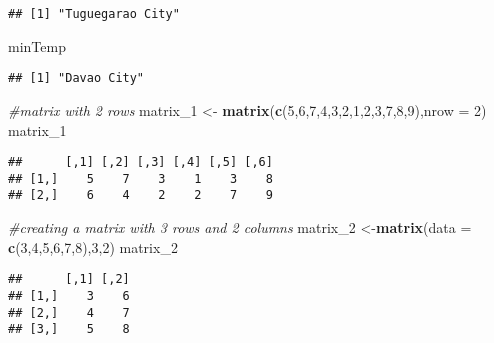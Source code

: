 \documentclass[
]{article}
\newenvironment{Shaded}{\begin{snugshade}}{\end{snugshade}}
\newcommand{\AttributeTok}[1]{\textcolor[rgb]{0.13,0.29,0.53}{#1}}
\newcommand{\CommentTok}[1]{\textcolor[rgb]{0.56,0.35,0.01}{\textit{#1}}}
\newcommand{\DecValTok}[1]{\textcolor[rgb]{0.00,0.00,0.81}{#1}}
\newcommand{\FunctionTok}[1]{\textcolor[rgb]{0.13,0.29,0.53}{\textbf{#1}}}
\newcommand{\NormalTok}[1]{#1}
\newcommand{\OtherTok}[1]{\textcolor[rgb]{0.56,0.35,0.01}{#1}}
\begin{document}
\begin{verbatim}
## [1] "Tuguegarao City"
\end{verbatim}

\begin{Shaded}
\begin{Highlighting}[]
\NormalTok{minTemp}
\end{Highlighting}
\end{Shaded}

\begin{verbatim}
## [1] "Davao City"
\end{verbatim}

\begin{Shaded}
\begin{Highlighting}[]
\CommentTok{\#matrix with 2 rows}
\NormalTok{matrix\_1 }\OtherTok{\textless{}{-}} \FunctionTok{matrix}\NormalTok{(}\FunctionTok{c}\NormalTok{(}\DecValTok{5}\NormalTok{,}\DecValTok{6}\NormalTok{,}\DecValTok{7}\NormalTok{,}\DecValTok{4}\NormalTok{,}\DecValTok{3}\NormalTok{,}\DecValTok{2}\NormalTok{,}\DecValTok{1}\NormalTok{,}\DecValTok{2}\NormalTok{,}\DecValTok{3}\NormalTok{,}\DecValTok{7}\NormalTok{,}\DecValTok{8}\NormalTok{,}\DecValTok{9}\NormalTok{),}\AttributeTok{nrow =} \DecValTok{2}\NormalTok{)}
\NormalTok{matrix\_1}
\end{Highlighting}
\end{Shaded}

\begin{verbatim}
##      [,1] [,2] [,3] [,4] [,5] [,6]
## [1,]    5    7    3    1    3    8
## [2,]    6    4    2    2    7    9
\end{verbatim}

\begin{Shaded}
\begin{Highlighting}[]
\CommentTok{\#creating a matrix with 3 rows and 2 columns}
\NormalTok{matrix\_2 }\OtherTok{\textless{}{-}}\FunctionTok{matrix}\NormalTok{(}\AttributeTok{data =} \FunctionTok{c}\NormalTok{(}\DecValTok{3}\NormalTok{,}\DecValTok{4}\NormalTok{,}\DecValTok{5}\NormalTok{,}\DecValTok{6}\NormalTok{,}\DecValTok{7}\NormalTok{,}\DecValTok{8}\NormalTok{),}\DecValTok{3}\NormalTok{,}\DecValTok{2}\NormalTok{)}
\NormalTok{matrix\_2}
\end{Highlighting}
\end{Shaded}

\begin{verbatim}
##      [,1] [,2]
## [1,]    3    6
## [2,]    4    7
## [3,]    5    8
\end{verbatim}
\end{document}
